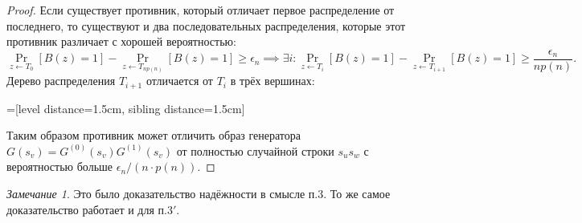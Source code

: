\documentclass[12pt,a4paper]{article}
\theoremstyle{definition}
\theoremstyle{plain}
\theoremstyle{remark}
\newtheorem{remark}{Замечание}[section]
\begin{document}
\begin{proof}
Если существует противник, который отличает первое распределение от последнего,
то существуют и два последовательных распределения, которые этот противник различает с хорошей вероятностью:
$$
\Pr_{z\gets T_0}[B(z) = 1] - \Pr_{z\gets T_{np(n)}}[B(z) = 1] \ge \epsilon_n \implies
\exists i: \Pr_{z\gets T_i}[B(z) = 1] - \Pr_{z\gets T_{i+1}}[B(z) = 1] \ge \frac{\epsilon_n}{np(n)}.
$$
Дерево распределения $T_{i+1}$ отличается от $T_i$ в трёх вершинах:
\begin{center}
=[level distance=1.5cm, sibling distance=1.5cm]
\hspace{1cm}
\end{center}
Таким образом противник может отличить образ генератора $G(s_v) = G^{(0)}(s_v)G^{(1)}(s_v)$ от полностью случайной строки $s_us_w$
с вероятностью больше $\epsilon_n/(n\cdot p(n))$.
\end{proof}
\begin{remark}
Это было доказательство надёжности в смысле п.3. 
То же самое доказательство работает и для п.$3'$. 
\end{remark}
\end{document}
